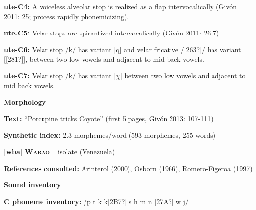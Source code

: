 \begin{styleBody}
\textbf{ute-C4: }A voiceless alveolar stop is realized as a flap intervocalically (Givón 2011: 25; process rapidly phonemicizing).
\end{styleBody}

\begin{styleBody}
\textbf{ute-C5: }Velar stops are spirantized intervocalically (Givón 2011: 26-7).
\end{styleBody}

\begin{styleBody}
\textbf{ute-C6:} Velar stop /k/ has variant [q] and velar fricative /[263?]/ has variant [[281?]], between two low vowels and adjacent to mid back vowels.
\end{styleBody}

\begin{styleBody}
\textbf{ute-C7: }Velar stop /k/ has variant [$\chi $] between two low vowels and adjacent to mid back vowels.
\end{styleBody}

\begin{styleBody}
\textbf{Morphology}
\end{styleBody}

\begin{styleBody}
\textbf{Text:} “Porcupine tricks Coyote” (first 5 pages, Givón 2013: 107-111)
\end{styleBody}

\begin{styleBody}
\textbf{Synthetic index: }2.3 morphemes/word (593 morphemes, 255 words)
\end{styleBody}

\clearpage\begin{styleBody}
\textbf{[wba] }\textbf{\textsc{Warao}}\textbf{\ \ }isolate (Venezuela)
\end{styleBody}

\begin{styleBody}
\textbf{References consulted: }Arinterol (2000), Osborn (1966), Romero-Figeroa (1997)
\end{styleBody}

\begin{styleBody}
\textbf{Sound inventory}
\end{styleBody}

\begin{styleBody}
\textbf{C phoneme inventory:} /p t k k[2B7?] s h m n [27A?] w j/
\end{styleBody}

